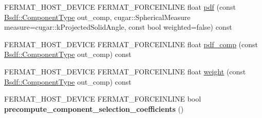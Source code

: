 \begin{DoxyCompactItemize}
\item 
F\+E\+R\+M\+A\+T\+\_\+\+H\+O\+S\+T\+\_\+\+D\+E\+V\+I\+CE F\+E\+R\+M\+A\+T\+\_\+\+F\+O\+R\+C\+E\+I\+N\+L\+I\+NE float \hyperlink{group___path_module_gae689ddf830059ea1ebe7a235c954b25f}{pdf} (const \hyperlink{struct_bsdf_a5f7db6f81220ed9ee6da109d6eb5b585}{Bsdf\+::\+Component\+Type} out\+\_\+comp, cugar\+::\+Spherical\+Measure measure=cugar\+::k\+Projected\+Solid\+Angle, const bool weighted=false) const
\item 
F\+E\+R\+M\+A\+T\+\_\+\+H\+O\+S\+T\+\_\+\+D\+E\+V\+I\+CE F\+E\+R\+M\+A\+T\+\_\+\+F\+O\+R\+C\+E\+I\+N\+L\+I\+NE float \hyperlink{group___path_module_gaad6ea81c789229423f13731f4d7b1088}{pdf\+\_\+comp} (const \hyperlink{struct_bsdf_a5f7db6f81220ed9ee6da109d6eb5b585}{Bsdf\+::\+Component\+Type} out\+\_\+comp) const
\item 
F\+E\+R\+M\+A\+T\+\_\+\+H\+O\+S\+T\+\_\+\+D\+E\+V\+I\+CE F\+E\+R\+M\+A\+T\+\_\+\+F\+O\+R\+C\+E\+I\+N\+L\+I\+NE float \hyperlink{group___path_module_ga26ab6168a450774594081beba929f9fa}{weight} (const \hyperlink{struct_bsdf_a5f7db6f81220ed9ee6da109d6eb5b585}{Bsdf\+::\+Component\+Type} out\+\_\+comp) const
\item 
F\+E\+R\+M\+A\+T\+\_\+\+H\+O\+S\+T\+\_\+\+D\+E\+V\+I\+CE F\+E\+R\+M\+A\+T\+\_\+\+F\+O\+R\+C\+E\+I\+N\+L\+I\+NE bool {\bfseries precompute\+\_\+component\+\_\+selection\+\_\+coefficients} ()
\end{DoxyCompactItemize}
